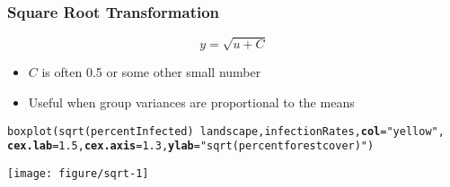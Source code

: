 \documentclass[color=usenames,dvipsnames]{beamer}\usepackage[]{graphicx}\usepackage[]{color}
\makeatletter
\newcommand{\hlnum}[1]{\textcolor[rgb]{0.69,0.494,0}{#1}}%
\newcommand{\hlstr}[1]{\textcolor[rgb]{0.749,0.012,0.012}{#1}}%
\newcommand{\hlopt}[1]{\textcolor[rgb]{0,0,0}{#1}}%
\newcommand{\hlstd}[1]{\textcolor[rgb]{0,0,0}{#1}}%
\newcommand{\hlkwc}[1]{\textcolor[rgb]{0,0,0}{\textbf{#1}}}%
\newcommand{\hlkwd}[1]{\textcolor[rgb]{0.004,0.004,0.506}{#1}}%
\newenvironment{kframe}{%
 \def\at@end@of@kframe{}%
 \ifinner\ifhmode%
  \def\at@end@of@kframe{\end{minipage}}%
  \begin{minipage}{\columnwidth}%
 \fi\fi%
 \def\FrameCommand##1{\hskip\@totalleftmargin \hskip-\fboxsep
 \colorbox{shadecolor}{##1}\hskip-\fboxsep
     \hskip-\linewidth \hskip-\@totalleftmargin \hskip\columnwidth}%
 \MakeFramed {\advance\hsize-\width
   \@totalleftmargin\z@ \linewidth\hsize
   \@setminipage}}%
 {\par\unskip\endMakeFramed%
 \at@end@of@kframe}
\newenvironment{knitrout}{}{} %
\makeatother
\begin{document}
\begin{frame}[fragile]
  \frametitle{Square Root Transformation}
  \[
  y = \sqrt{u + C}
  \]
  \begin{itemize}%
    \small
    \item $C$ is often 0.5 or some other small number
    \item Useful when group variances are proportional to the means
  \end{itemize}
  \pause
\begin{knitrout}\scriptsize
{}\color{fgcolor}\begin{kframe}
\begin{alltt}
\hlkwd{boxplot}\hlstd{(}\hlkwd{sqrt}\hlstd{(percentInfected)}\hlopt{~}\hlstd{landscape, infectionRates,} \hlkwc{col}\hlstd{=}\hlstr{"yellow"}\hlstd{,}
        \hlkwc{cex.lab}\hlstd{=}\hlnum{1.5}\hlstd{,} \hlkwc{cex.axis}\hlstd{=}\hlnum{1.3}\hlstd{,} \hlkwc{ylab}\hlstd{=}\hlstr{"sqrt(percent forest cover)"}\hlstd{)}
\end{alltt}
\end{kframe}

{\centering \texttt{[image: figure/sqrt-1]} 

}



\end{knitrout}
\end{frame}



\end{document}
